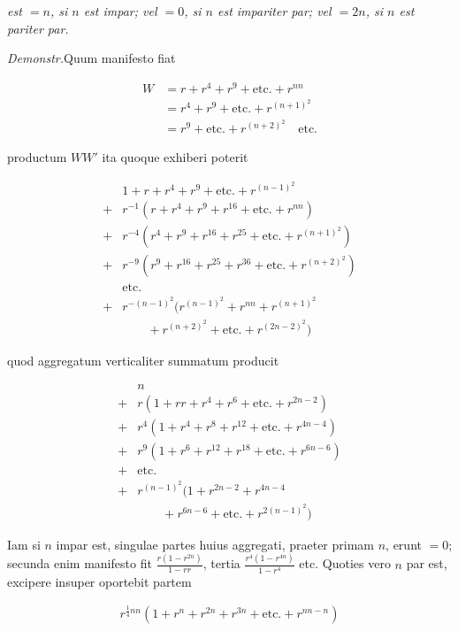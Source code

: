 \textit{est $=n$, si $n$ est impar; vel $=0$, si $n$ est impariter par; vel $=2n$, si $n$ est} \textit{pariter par.}

\textit{Demonstr.}\quad Quum manifesto fiat

\[
\begin{aligned}
W&=r+r^4+r^9+\text{etc.}+r^{nn}\\
&=r^4+r^9+\text{etc.}+r^{(n+1)^2}\\
&=r^9+\text{etc.}+r^{(n+2)^2}\quad\text{etc.}
\end{aligned}
\]

productum $WW'$ ita quoque exhiberi poterit

\[
\begin{aligned}
&1+r+r^4+r^9+\text{etc.}+r^{(n-1)^2}\\
+{}&r^{-1}(r+r^4+r^9+r^{16}+\text{etc.}+r^{nn})\\
+{}&r^{-4}(r^4+r^9+r^{16}+r^{25}+\text{etc.}+r^{(n+1)^2})\\
+{}&r^{-9}(r^9+r^{16}+r^{25}+r^{36}+\text{etc.}+r^{(n+2)^2})\\
&\text{etc.}\\
+{}&r^{-(n-1)^2}(r^{(n-1)^2}+r^{nn}+r^{(n+1)^2}\\&\qquad+r^{(n+2)^2}+\text{etc.}+r^{(2n-2)^2})
\end{aligned}
\]

quod aggregatum verticaliter summatum producit

\[
\begin{aligned}
&n\\
+{}&r(1+rr+r^4+r^6+\text{etc.}+r^{2n-2})\\
+{}&r^4(1+r^4+r^8+r^{12}+\text{etc.}+r^{4n-4})\\
+{}&r^9(1+r^6+r^{12}+r^{18}+\text{etc.}+r^{6n-6})\\
+{}&\text{etc.}\\
+{}&r^{(n-1)^2}(1+r^{2n-2}+r^{4n-4}\\&\qquad+r^{6n-6}+\text{etc.}+r^{2(n-1)^2})
\end{aligned}
\]

Iam si $n$ impar est, singulae partes huius aggregati, praeter primam $n$, erunt $=0$; secunda enim manifesto fit $\frac{r(1-r^{2n})}{1-rr}$, tertia $\frac{r^4(1-r^{4n})}{1-r^4}$ etc. Quoties vero $n$ par est, excipere insuper oportebit partem


\[
\begin{aligned}
r^{\frac14nn}(1+r^n+r^{2n}+r^{3n}+\text{etc.}+r^{nn-n})
\end{aligned}
\]

